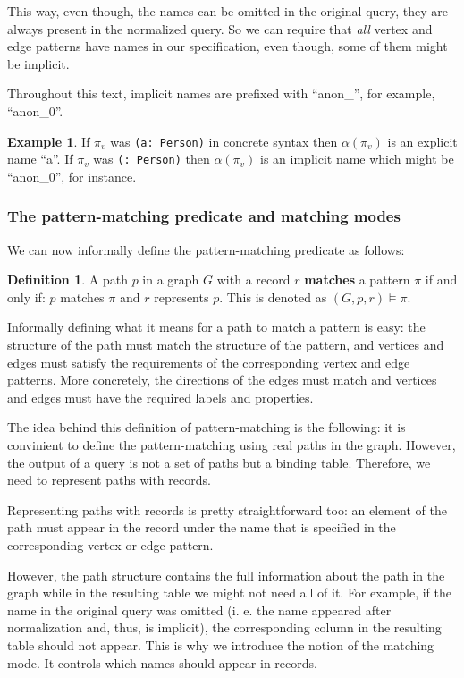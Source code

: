 \documentclass[14pt]{constructor-thesis}
\theoremstyle{definition}
\newtheorem{definition}{Definition}
\newtheorem{example}{Example}
\begin{document}
This way, even though, the names can be omitted in the original query, they are always present in the normalized query. So we can require that \textit{all} vertex and edge patterns have names in our specification, even though, some of them might be implicit.

Throughout this text, implicit names are prefixed with ``anon\_'', for example, ``anon\_0''.

\begin{example}
  If $\pi_v$ was \texttt{(a: Person)} in concrete syntax then $\alpha(\pi_v)$ is an explicit name ``a''. If $\pi_v$ was \texttt{(: Person)} then $\alpha(\pi_v)$ is an implicit name which might be ``anon\_0'', for instance.
\end{example}

\subsubsection{The pattern-matching predicate and matching modes}

We can now informally define the pattern-matching predicate as follows:

\begin{definition}
   A path $p$ in a graph $G$ with a record $r$ \textbf{matches} a pattern $\pi$ if and only if: $p$ matches $\pi$ and $r$ represents $p$. This is denoted as $(G, p, r) \models \pi$.
\end{definition}

Informally defining what it means for a path to match a pattern is easy: the structure of the path must match the structure of the pattern, and vertices and edges must satisfy the requirements of the corresponding vertex and edge patterns. More concretely, the directions of the edges must match and vertices and edges must have the required labels and properties.

The idea behind this definition of pattern-matching is the following: it is convinient to define the pattern-matching using real paths in the graph. However, the output of a query is not a set of paths but a binding table. Therefore, we need to represent paths with records.

Representing paths with records is pretty straightforward too: an element of the path must appear in the record under the name that is specified in the corresponding vertex or edge pattern.

However, the path structure contains the full information about the path in the graph while in the resulting table we might not need all of it. For example, if the name in the original query was omitted (i. e. the name appeared after normalization and, thus, is implicit), the corresponding column in the resulting table should not appear. This is why we introduce the notion of the matching mode. It controls which names should appear in records.
\end{document}
